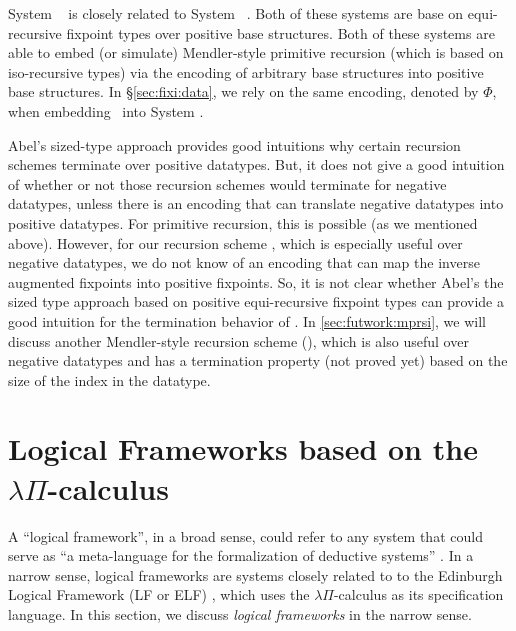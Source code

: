 System \Fwhat\ \cite{abel06phd} is closely related to
System \Fixw\ \cite{AbeMat04}. Both of these systems are base on
equi-recursive fixpoint types over positive base structures.
Both of these systems are able to embed (or simulate) Mendler-style
primitive recursion (which is based on iso-recursive types) via
the encoding \cite{Geu92} of arbitrary base structures into
positive base structures. In \S\ref{sec:fixi:data}, we rely on
the same encoding, denoted by $\Phi$, when embedding \MPr\ into System \Fixi.

Abel's sized-type approach provides good intuitions why 
certain recursion schemes terminate over positive datatypes.
But, it does not give a good intuition of whether or not
those recursion schemes would terminate for negative datatypes,
unless there is an encoding that can translate negative datatypes into
positive datatypes. For primitive recursion, this is possible (as we
mentioned above). However, for our recursion scheme \MsfIt, which is
especially useful over negative datatypes, we do not know of an encoding
that can map the inverse augmented fixpoints into positive fixpoints.
So, it is not clear whether Abel's the sized type approach based on
positive equi-recursive fixpoint types can provide a good intuition
for the termination behavior of \MsfIt.  In \ref{sec:futwork:mprsi},
we will discuss another Mendler-style recursion scheme (\mprsi), which
is also useful over negative datatypes and has a termination property
(not proved yet) based on the size of the index in the datatype.

\section{Logical Frameworks based on the $\lambda\Pi$-calculus}
\label{sec:relwork:LF}
A ``logical framework'', in a broad sense, could refer to
any system that could serve as ``a meta-language for
the formalization of deductive systems'' \cite{Pfe02LFintro}.
In a narrow sense, logical frameworks are systems closely related to
to the Edinburgh Logical Framework (LF or ELF) \cite{Harper87}, which
uses the $\lambda\Pi$-calculus as its specification language.
In this section, we discuss \emph{logical frameworks} in the narrow sense.


